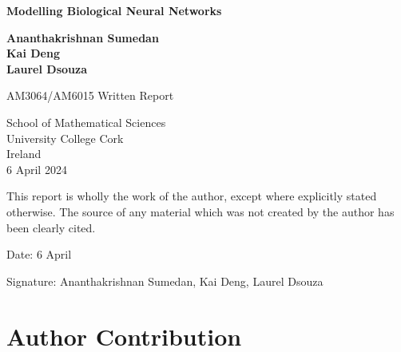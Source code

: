 \documentclass[12pt,a4paper]{report}
\begin{document}


\begin{titlepage} \vspace{1cm}

    \begin{center}
    \textbf{\Huge Modelling Biological Neural Networks}
    \end{center}
    
    \vspace{1.5cm}
    
    \begin{center}
    \textbf{\LARGE Ananthakrishnan Sumedan \\ Kai Deng \\ Laurel Dsouza }{\LARGE\par}
    \end{center}
    
    \vfill{}
    
    \begin{center}
    {\Large AM3064/AM6015 Written Report}
    \par\end{center}
    
    \vspace{1cm}
    
    \begin{center}
    \Large{School of Mathematical Sciences \\
    University College Cork \\
    Ireland \\
    6 April 2024}
    \end{center}
    
\end{titlepage}

This report is wholly the work of the author, except where explicitly
stated otherwise. The source of any material which was not created
by the author has been clearly cited. \\
\medskip{}

Date: 6 April

\medskip{}

Signature: Ananthakrishnan Sumedan, Kai Deng, Laurel Dsouza


\tableofcontents{}

\chapter{Author Contribution}
\end{document}
